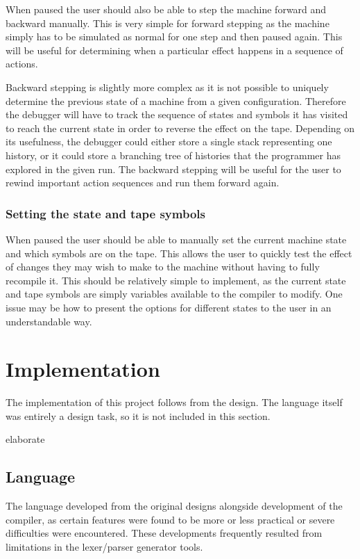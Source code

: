 \documentclass[11pt]{article}
\begin{document}
When paused the user should also be able to step the machine forward and backward manually. This is very simple for forward stepping as the machine simply has to be simulated as normal for one step and then paused again. This will be useful for determining when a particular effect happens in a sequence of actions.

Backward stepping is slightly more complex as it is not possible to uniquely determine the previous state of a machine from a given configuration. Therefore the debugger will have to track the sequence of states and symbols it has visited to reach the current state in order to reverse the effect on the tape. Depending on its usefulness, the debugger could either store a single stack representing one history, or it could store a branching tree of histories that the programmer has explored in the given run. The backward stepping will be useful for the user to rewind important action sequences and run them forward again.

\subsubsection{Setting the state and tape symbols}

When paused the user should be able to manually set the current machine state and which symbols are on the tape. This allows the user to quickly test the effect of changes they may wish to make to the machine without having to fully recompile it. This should be relatively simple to implement, as the current state and tape symbols are simply variables available to the compiler to modify. One issue may be how to present the options for different states to the user in an understandable way.

\section{Implementation}

The implementation of this project follows from the design. The language itself was entirely a design task, so it is not included in this section.

elaborate


\subsection{Language}

The language developed from the original designs alongside development of the compiler, as certain features were found to be more or less practical or severe difficulties were encountered. These developments frequently resulted from limitations in the lexer/parser generator tools.
\end{document}
